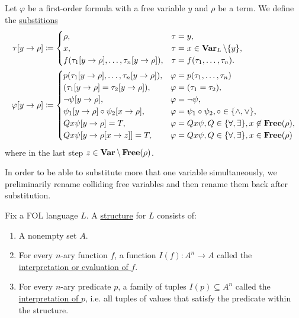 \begin{definition}\label{def:first_order_substition}
  Let $\varphi$ be a first-order formula with a free variable $y$ and $\rho$ be a term. We define the \uline{substitions}
  \begin{align*}
    \tau[y \to \rho] &\coloneqq \begin{cases}
      \rho,                                              &\tau = y, \\
      x,                                                 &\tau = x \in \operatorname{\mathbf{Var}}_L \setminus \{ y \}, \\
      f(\tau_1[y \to \rho], \ldots, \tau_n[y \to \rho]), &\tau = f(\tau_1, \ldots, \tau_n).
    \end{cases}
    \\
    \varphi[y \to \rho] &\coloneqq \begin{cases}
      p(\tau_1[y \to \rho], \ldots, \tau_n[y \to \rho]), &\varphi = p(\tau_1, \ldots, \tau_n) \\
      (\tau_1[y \to \rho] = \tau_2[y \to \rho]),         &\varphi = (\tau_1 = \tau_2), \\
      \neg \psi[y \to \rho],                             &\varphi = \neg \psi, \\
      \psi_1[y \to \rho] \circ \psi_2[x \to \rho],       &\varphi = \psi_1 \circ \psi_2, \circ \in \{ \land, \lor \}, \\
      Q x \psi[y \to \rho] = T,                          &\varphi = Q x \psi, Q \in \{ \forall, \exists \}, x \not\in \operatorname{\mathbf{Free}}(\rho), \\
      Q x \psi[y \to \rho[x \to z]] = T,                 &\varphi = Q x \psi, Q \in \{ \forall, \exists \}, x \in \operatorname{\mathbf{Free}}(\rho)
    \end{cases}
  \end{align*}
  where in the last step $z \in \operatorname{\mathbf{Var}} \setminus \operatorname{\mathbf{Free}}(\rho)$.

  In order to be able to substitute more that one variable simultaneously, we preliminarily rename colliding free variables and then rename them back after substitution.
\end{definition}

\begin{definition}\label{def:first_order_structure}\cite[25]{Lectures:logic_programming}
  Fix a FOL language $L$. A \uline{structure} for $L$ consists of:
  \begin{enumerate}
    \item A nonempty set $A$.
    \item For every $n$-ary function $f$, a function $I(f): A^n \to A$ called the \uline{interpretation or evaluation of $f$}.
    \item For every $n$-ary predicate $p$, a family of tuples $I(p) \subseteq A^n$ called the \uline{interpretation of $p$}, i.e. all tuples of values that satisfy the predicate within the structure.
  \end{enumerate}
\end{definition}


